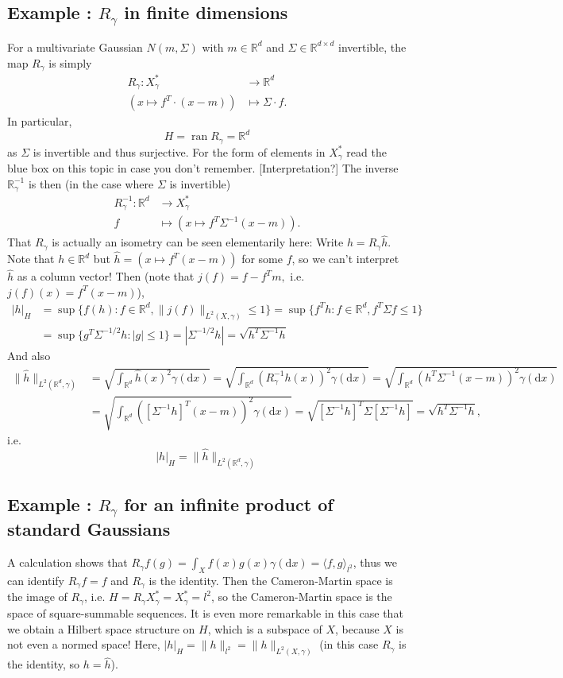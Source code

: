 \documentclass{scrartcl}
\theoremstyle{definition}
\theoremstyle{remark}
\newcommand{\de}{\mathrm d}
\newcommand{\R}{\mathbb R}
\newcommand{\ednote}[1]{{\color{red}[#1]}}
\newcommand*\circled[1]{\tikz[baseline=(char.base)]{
            \node[shape=circle,draw,inner sep=2pt] (char) {#1};}}
\DeclareRobustCommand{\myboxtwo}[2][blue!20]{%
\begin{tcolorbox}[   %
        breakable,
        left=0pt,
        right=0pt,
        top=0pt,
        bottom=0pt,
        colback=#1,
        colframe=#1,
        width=\dimexpr\textwidth\relax, 
        enlarge left by=0mm,
        boxsep=5pt,
        arc=10pt,outer arc=10pt,
        ]
        #2
\end{tcolorbox}
}
\begin{document}
\myboxtwo[blue!20]{
\subsection*{Example \circled{1}: $R_\gamma$ in finite dimensions}
For a multivariate Gaussian $N(m, \Sigma)$ with $m\in\R^d$ and $\Sigma \in \R^{d\times d}$ invertible, the map $R_\gamma$ is simply 
\begin{align*}
R_\gamma : X_\gamma^* &\to \R^d\\
(x\mapsto f^T \cdot (x-m)) &\mapsto \Sigma \cdot f.
\end{align*}
In particular,
\[ H = \operatorname{ran} R_\gamma = \R^d \]
as $\Sigma$ is invertible and thus surjective.
For the form of elements in $X_\gamma^*$ read the blue box on this topic in case you don't remember. \ednote{Interpretation?} The inverse $\R_\gamma^{-1}$ is then (in the case where $\Sigma$ is invertible)
\begin{align*}
R_\gamma^{-1}: \R^d &\to X_\gamma^*\\
f &\mapsto (x\mapsto f^T \Sigma^{-1}(x-m)).
\end{align*}
That $R_\gamma$ is actually an isometry can be seen elementarily here: Write $h = R_\gamma \hat h$. Note that $h \in \R^d$ but $\hat h =(x\mapsto f^T(x-m))$ for some $f$, so we can't interpret $\hat h$ as a column vector! Then (note that $j(f) = f - f^Tm,$ i.e. $j(f)(x) = f^T(x-m)$),
\begin{align*}
|h|_H &= \sup\{f(h): f\in \R^d, \|j(f)\|_{L^2(X, \gamma)} \leq 1\} = \sup\{f^Th: f\in \R^d, f^T\Sigma f \leq 1\}\\
&= \sup\{g^T\Sigma^{-1/2}h: |g| \leq 1\} = |\Sigma^{-1/2}h| = \sqrt{h^T\Sigma^{-1}h}
\end{align*}
And also
\begin{align*}
\|\hat h\|_{L^2(\R^d, \gamma)} &= \sqrt{\int_{\R^d}\hat h(x)^2 \gamma(\de x)} = \sqrt{\int_{\R^d}(R_\gamma^{-1} h(x))^2 \gamma(\de x)} = \sqrt{\int_{\R^d}(h^T\Sigma^{-1}(x-m))^2 \gamma(\de x)}\\
&=\sqrt{\int_{\R^d}([\Sigma^{-1}h]^T(x-m))^2 \gamma(\de x)} = \sqrt{[\Sigma^{-1}h]^T\Sigma [\Sigma^{-1}h]} = \sqrt{h^T\Sigma^{-1}h},
\end{align*}
i.e. \[|h|_H = \|\hat h\|_{L^2(\R^d, \gamma)}\]
}

\myboxtwo{
\subsection*{Example \circled{2}: $R_\gamma$ for an infinite product of standard Gaussians}
A calculation shows that $R_\gamma f(g) = \int_X f(x)g(x)\gamma(\de x) = \langle f, g\rangle_{l^2}$, thus we can identify $R_\gamma f = f$ and $R_\gamma$ is the identity. Then the Cameron-Martin space is the image of $R_\gamma$, i.e. $H = R_\gamma X_\gamma^* = X_\gamma^* = l^2$, so the Cameron-Martin space is the space of square-summable sequences. It is even more remarkable in this case that we obtain a Hilbert space structure on $H$, which is a subspace of $X$, because $X$ is not even a normed space! Here, $|h|_H = \|h\|_{l^2} = \|h\|_{L^2(X,\gamma)}$ (in this case $R_\gamma$ is the identity, so $h = \hat h$).
}
\end{document}
